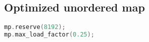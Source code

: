 \subsection{Optimized unordered map}

\begin{lstlisting}[language=C++]
mp.reserve(8192);
mp.max_load_factor(0.25);
\end{lstlisting}